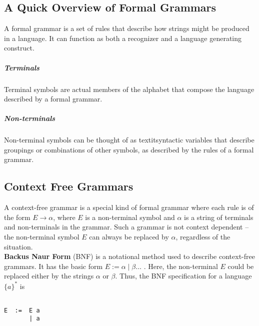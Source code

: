 \begin{appendices}


\chapter{A Quick Overview of Formal Grammars}

A formal grammar is a set of rules that describe how strings might be produced in a language.  It can function as both a recognizer and a language generating construct. 

\paragraph{Terminals}

Terminal symbols are actual members of the alphabet that compose the language described by a formal grammar.

\paragraph{Non-terminals}

Non-terminal symbols can be thought of as textit{syntactic variables} that describe groupings or combinations of other symbols, as described by the rules of a formal grammar.

\section{Context Free Grammars}

A context-free grammar is a special kind of formal grammar where each rule is of the form $E \rightarrow \alpha$, where $E$ is a non-terminal symbol and $\alpha$ is a string of terminals and non-terminals in the grammar. Such a grammar is not context dependent -- the non-terminal symbol $E$ can always be replaced by $\alpha$, regardless of the situation.\\

\textbf{Backus Naur Form} (BNF) is a notational method used to describe context-free grammars. It has the basic form
$E := \alpha \mid \beta \ldots$ \cite{BNF}. Here, the non-terminal $E$ could be replaced either by the strings $\alpha$ or $\beta$. Thus, the BNF specification for a language $\{a\}^{*}$ is

\begin{Verbatim}[frame=single]

E  :=  E a
       | a

\end{Verbatim}


\end{appendices}
